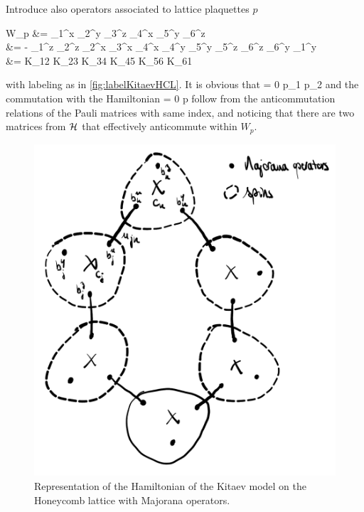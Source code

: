 		Introduce also operators associated to lattice plaquettes $p$
		\be \begin{split} W_p &= \sigma_1^x \sigma_2^y \sigma_3^z \sigma_4^x \sigma_5^y \sigma_6^z \\ &= - \sigma_1^z \sigma_2^z \sigma_2^x \sigma_3^x \sigma_4^x \sigma_4^y \sigma_5^y \sigma_5^z \sigma_6^z \sigma_6^y \sigma_1^y \\ &= K_{12} K_{23} K_{34} K_{45} K_{56} K_{61} \end{split} \ee
		with labeling as in \autoref{fig:labelKitaevHCL}. It is obvious that
		\be [W_{p_1}, W_{p_2}] = 0 \quad \forall p_1 \neq p_2 \ee
		and the commutation with the Hamiltonian
		\be [\mc H, W_p] = 0 \quad \forall p \ee
		follow from the anticommutation relations of the Pauli matrices with same index, and noticing that there are two matrices from $\mathcal H$ that effectively anticommute within $W_p$.

		\begin{figure}[h!]
            \centering
            \includegraphics[scale=0.25]{graphs/labelKitaevHCL.png}
            \caption{Representation of the Hamiltonian of the Kitaev model on the Honeycomb lattice with Majorana operators.}
            \label{fig:labelKitaevHCL}
        \end{figure}


